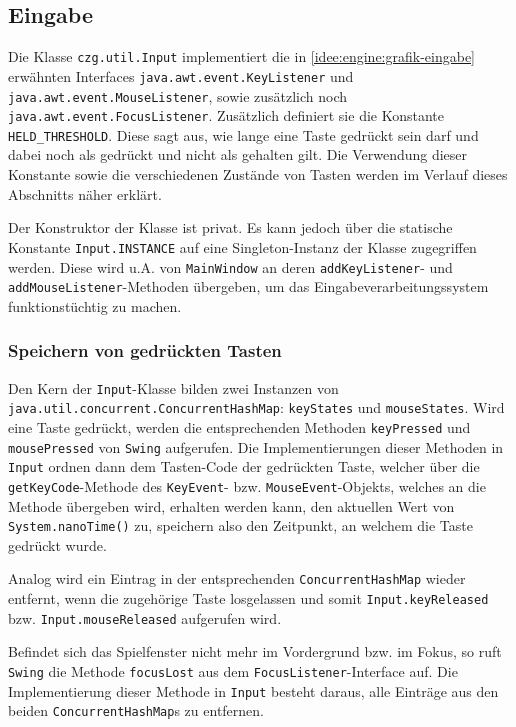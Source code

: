 \begin{sloppypar}
\subsection{Eingabe} \label{programm:engine:eingabe}

Die Klasse \texttt{czg.util.Input} implementiert die in
\ref{idee:engine:grafik-eingabe} erwähnten Interfaces
\texttt{java.awt.event.KeyListener} und \texttt{java.awt.event.MouseListener},
sowie zusätzlich noch \texttt{java.awt.event.FocusListener}.
Zusätzlich definiert sie die Konstante \texttt{HELD\_THRESHOLD}.
Diese sagt aus, wie lange eine Taste gedrückt sein darf und
dabei noch als gedrückt und nicht als gehalten gilt.
Die Verwendung dieser Konstante sowie die verschiedenen
Zustände von Tasten werden im Verlauf dieses Abschnitts
näher erklärt.

Der Konstruktor der Klasse ist privat. Es kann jedoch
über die statische Konstante \texttt{Input.INSTANCE}
auf eine Singleton-Instanz der Klasse zugegriffen werden.
Diese wird u.A. von \texttt{MainWindow} an deren
\texttt{addKeyListener}- und \texttt{addMouseListener}-Methoden
übergeben, um das Eingabeverarbeitungssystem funktionstüchtig
zu machen.


\subsubsection{Speichern von gedrückten Tasten}

Den Kern der \texttt{Input}-Klasse bilden zwei Instanzen von
\texttt{java.util.concurrent.ConcurrentHashMap}:
\texttt{keyStates} und \texttt{mouseStates}.
Wird eine Taste gedrückt, werden die entsprechenden
Methoden \texttt{keyPressed} und \texttt{mousePressed} von
\texttt{Swing} aufgerufen. Die Implementierungen dieser
Methoden in \texttt{Input} ordnen dann dem Tasten-Code der
gedrückten Taste, welcher über die \texttt{getKeyCode}-Methode
des \texttt{KeyEvent}- bzw. \texttt{MouseEvent}-Objekts,
welches an die Methode übergeben wird, erhalten werden kann,
den aktuellen Wert von \texttt{System.nanoTime()} zu, speichern
also den Zeitpunkt, an welchem die Taste gedrückt wurde.

Analog wird ein Eintrag in der entsprechenden \texttt{ConcurrentHashMap}
wieder entfernt, wenn die zugehörige Taste losgelassen und
somit \texttt{Input.keyReleased} bzw. \texttt{Input.mouseReleased}
aufgerufen wird.

Befindet sich das Spielfenster nicht mehr im Vordergrund bzw. im Fokus,
so ruft \texttt{Swing} die Methode \texttt{focusLost} aus dem \texttt{FocusListener}-Interface
auf. Die Implementierung dieser Methode in \texttt{Input} besteht
daraus, alle Einträge aus den beiden \texttt{ConcurrentHashMap}s zu
entfernen.



\end{sloppypar}
